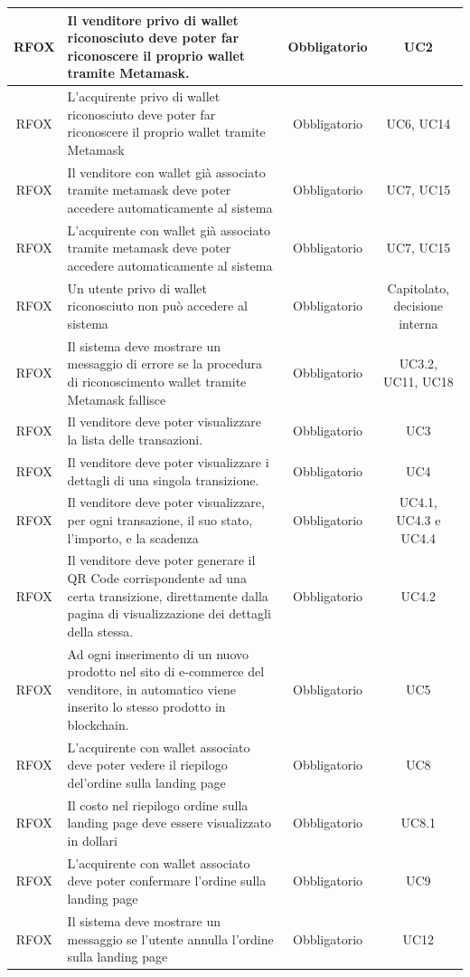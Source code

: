 \documentclass[a4paper, 12pt]{article}
\begin{document}
\begin{longtable}{|c|p{5cm}|c|c|}
\hline
RFOX & Il venditore privo di wallet riconosciuto deve poter far riconoscere il proprio wallet tramite Metamask. & Obbligatorio & UC2 \\
\hline
RFOX & L'acquirente privo di wallet riconosciuto deve poter far riconoscere il proprio wallet tramite Metamask & Obbligatorio & UC6, UC14 \\
\hline
RFOX & Il venditore con wallet già associato tramite metamask deve poter accedere automaticamente al sistema & Obbligatorio & UC7, UC15 \\
\hline
RFOX & L'acquirente con wallet già associato tramite metamask deve poter accedere automaticamente al sistema & Obbligatorio & UC7, UC15 \\
\hline
RFOX & Un utente privo di wallet riconosciuto non può accedere al sistema & Obbligatorio & Capitolato, decisione interna \\
\hline
RFOX & Il sistema deve mostrare un messaggio di errore se la procedura di riconoscimento wallet tramite Metamask fallisce & Obbligatorio & UC3.2, UC11, UC18 \\
\hline
RFOX & Il venditore deve poter visualizzare la lista delle transazioni. & Obbligatorio & UC3 \\ 
\hline
RFOX & Il venditore deve poter visualizzare i dettagli di una singola transizione. & Obbligatorio & UC4 \\ 
\hline
RFOX & Il venditore deve poter visualizzare, per ogni transazione, il suo stato, l'importo, e la scadenza & Obbligatorio & UC4.1, UC4.3 e UC4.4 \\ 
\hline
RFOX & Il venditore deve poter generare il QR Code corrispondente ad una certa transizione, direttamente dalla pagina di visualizzazione dei dettagli della stessa. & Obbligatorio & UC4.2 \\ 
\hline
RFOX & Ad ogni inserimento di un nuovo prodotto nel sito di e-commerce del venditore, in automatico viene inserito lo stesso prodotto in blockchain. & Obbligatorio & UC5 \\ 
\hline
RFOX & L'acquirente con wallet associato deve poter vedere il riepilogo del'ordine sulla landing page & Obbligatorio & UC8 \\
\hline
RFOX & Il costo nel riepilogo ordine sulla landing page deve essere visualizzato in dollari & Obbligatorio & UC8.1 \\
\hline
RFOX & L'acquirente con wallet associato deve poter confermare l'ordine sulla landing page & Obbligatorio & UC9 \\
\hline
RFOX & Il sistema deve mostrare un messaggio se l'utente annulla l'ordine sulla landing page & Obbligatorio & UC12 \\

\end{longtable}
\end{document}
